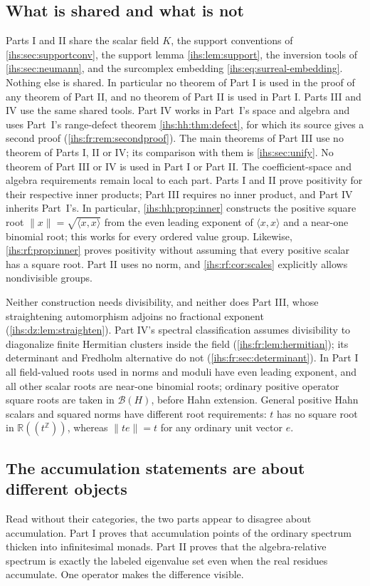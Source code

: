 \documentclass[11pt,a4paper]{article}
\numberwithin{equation}{section}
\theoremstyle{definition}
\theoremstyle{remark}
\newcommand{\R}{\mathbb R}
\newcommand{\Z}{\mathbb Z}
\newcommand{\K}{K}
\newcommand{\B}{\mathcal B(H)}
\newcommand{\norm}[1]{\lVert#1\rVert}
\newcommand{\ip}[2]{\langle#1,#2\rangle}
\begin{document}
\subsection{What is shared and what is not}\label{ihs:sec:sharednot}
Parts I and II share the scalar field $\K$, the support conventions of
\cref{ihs:sec:supportconv}, the support lemma \cref{ihs:lem:support}, the
inversion tools of \cref{ihs:sec:neumann}, and the surcomplex embedding
\eqref{ihs:eq:surreal-embedding}. Nothing else is shared. In particular no
theorem of Part I is used in the proof of any theorem of Part II, and no
theorem of Part II is used in Part I. Parts III and IV use the same shared
tools. Part IV works in Part~I's space and algebra and uses Part~I's
range-defect theorem \cref{ihs:hh:thm:defect}, for which its source gives a
second proof (\cref{ihs:fr:rem:secondproof}). The main theorems of Part III
use no theorem of Parts I, II or IV; its comparison with them is
\cref{ihs:sec:unify}. No theorem of Part III or IV is used in Part I or
Part II. The coefficient-space and algebra requirements remain local to
each part. Parts I and II prove positivity for their respective inner
products; Part III requires no inner product, and Part IV inherits Part~I's.
In particular,
\cref{ihs:hh:prop:inner} constructs the positive square root
$\norm x=\sqrt{\ip xx}$ from the even leading exponent of $\ip xx$ and a
near-one binomial root; this works for every ordered value group.
Likewise, \cref{ihs:rf:prop:inner} proves positivity without assuming that
every positive scalar has a square root. Part II uses no norm, and
\cref{ihs:rf:cor:scales} explicitly allows nondivisible groups.

Neither construction needs divisibility, and neither does Part III, whose
straightening automorphism adjoins no fractional exponent
(\cref{ihs:dz:lem:straighten}). Part IV's spectral classification assumes
divisibility to diagonalize finite Hermitian clusters inside the field
(\cref{ihs:fr:lem:hermitian}); its determinant and Fredholm alternative
do not (\cref{ihs:fr:sec:determinant}). In Part I all field-valued roots
used in norms and moduli have even leading exponent, and all other scalar
roots are near-one binomial roots; ordinary positive operator square roots
are taken in $\B$, before Hahn extension. General positive Hahn scalars
and squared norms have different root requirements:
$t$ has no square root in $\R((t^\Z))$, whereas $\norm{te}=t$ for any
ordinary unit vector $e$.

\subsection{The accumulation statements are about different objects}\label{ihs:sec:accum}
Read without their categories, the two parts appear to disagree about
accumulation. Part I proves that accumulation points of the ordinary
spectrum thicken into infinitesimal monads. Part II proves that the
algebra-relative spectrum is exactly the labeled eigenvalue set even when
the real residues accumulate. One operator makes the difference visible.
\end{document}
